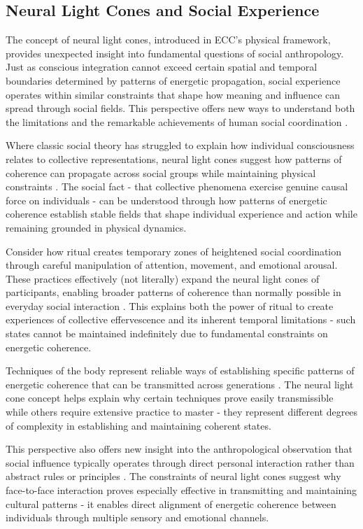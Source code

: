\subsection{Neural Light Cones and Social Experience}

The concept of neural light cones, introduced in ECC's physical framework, provides unexpected insight into fundamental questions of social anthropology. Just as conscious integration cannot exceed certain spatial and temporal boundaries determined by patterns of energetic propagation, social experience operates within similar constraints that shape how meaning and influence can spread through social fields. This perspective offers new ways to understand both the limitations and the remarkable achievements of human social coordination \cite{durkheim1995elementary}.

Where classic social theory has struggled to explain how individual consciousness relates to collective representations, neural light cones suggest how patterns of coherence can propagate across social groups while maintaining physical constraints \cite{schutz1967phenomenology}. The social fact - that collective phenomena exercise genuine causal force on individuals - can be understood through how patterns of energetic coherence establish stable fields that shape individual experience and action while remaining grounded in physical dynamics.

Consider how ritual creates temporary zones of heightened social coordination through careful manipulation of attention, movement, and emotional arousal. These practices effectively (not literally) expand the neural light cones of participants, enabling broader patterns of coherence than normally possible in everyday social interaction \cite{turner1969ritual}. This explains both the power of ritual to create experiences of collective effervescence and its inherent temporal limitations - such states cannot be maintained indefinitely due to fundamental constraints on energetic coherence.

Techniques of the body represent reliable ways of establishing specific patterns of energetic coherence that can be transmitted across generations \cite{mauss1973techniques}. The neural light cone concept helps explain why certain techniques prove easily transmissible while others require extensive practice to master - they represent different degrees of complexity in establishing and maintaining coherent states.

This perspective also offers new insight into the anthropological observation that social influence typically operates through direct personal interaction rather than abstract rules or principles \cite{goffman1967interaction}. The constraints of neural light cones suggest why face-to-face interaction proves especially effective in transmitting and maintaining cultural patterns - it enables direct alignment of energetic coherence between individuals through multiple sensory and emotional channels.

